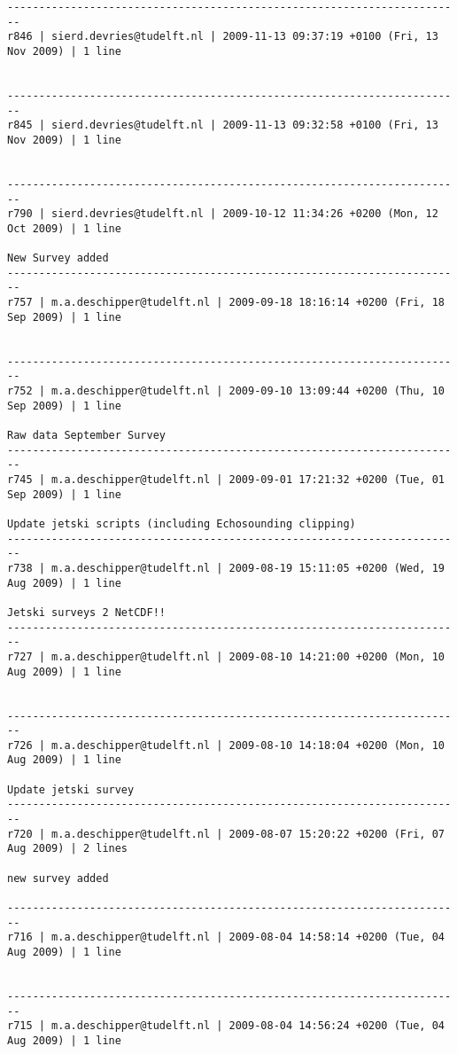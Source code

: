 \documentclass[9]{report}
\begin{document}
\begin{description}
\begin{verbatim}
------------------------------------------------------------------------
r846 | sierd.devries@tudelft.nl | 2009-11-13 09:37:19 +0100 (Fri, 13 Nov 2009) | 1 line


------------------------------------------------------------------------
r845 | sierd.devries@tudelft.nl | 2009-11-13 09:32:58 +0100 (Fri, 13 Nov 2009) | 1 line


------------------------------------------------------------------------
r790 | sierd.devries@tudelft.nl | 2009-10-12 11:34:26 +0200 (Mon, 12 Oct 2009) | 1 line

New Survey added
------------------------------------------------------------------------
r757 | m.a.deschipper@tudelft.nl | 2009-09-18 18:16:14 +0200 (Fri, 18 Sep 2009) | 1 line


------------------------------------------------------------------------
r752 | m.a.deschipper@tudelft.nl | 2009-09-10 13:09:44 +0200 (Thu, 10 Sep 2009) | 1 line

Raw data September Survey
------------------------------------------------------------------------
r745 | m.a.deschipper@tudelft.nl | 2009-09-01 17:21:32 +0200 (Tue, 01 Sep 2009) | 1 line

Update jetski scripts (including Echosounding clipping)
------------------------------------------------------------------------
r738 | m.a.deschipper@tudelft.nl | 2009-08-19 15:11:05 +0200 (Wed, 19 Aug 2009) | 1 line

Jetski surveys 2 NetCDF!!
------------------------------------------------------------------------
r727 | m.a.deschipper@tudelft.nl | 2009-08-10 14:21:00 +0200 (Mon, 10 Aug 2009) | 1 line


------------------------------------------------------------------------
r726 | m.a.deschipper@tudelft.nl | 2009-08-10 14:18:04 +0200 (Mon, 10 Aug 2009) | 1 line

Update jetski survey 
------------------------------------------------------------------------
r720 | m.a.deschipper@tudelft.nl | 2009-08-07 15:20:22 +0200 (Fri, 07 Aug 2009) | 2 lines

new survey added

------------------------------------------------------------------------
r716 | m.a.deschipper@tudelft.nl | 2009-08-04 14:58:14 +0200 (Tue, 04 Aug 2009) | 1 line


------------------------------------------------------------------------
r715 | m.a.deschipper@tudelft.nl | 2009-08-04 14:56:24 +0200 (Tue, 04 Aug 2009) | 1 line



\end{verbatim}
\end{description}
\end{document}
